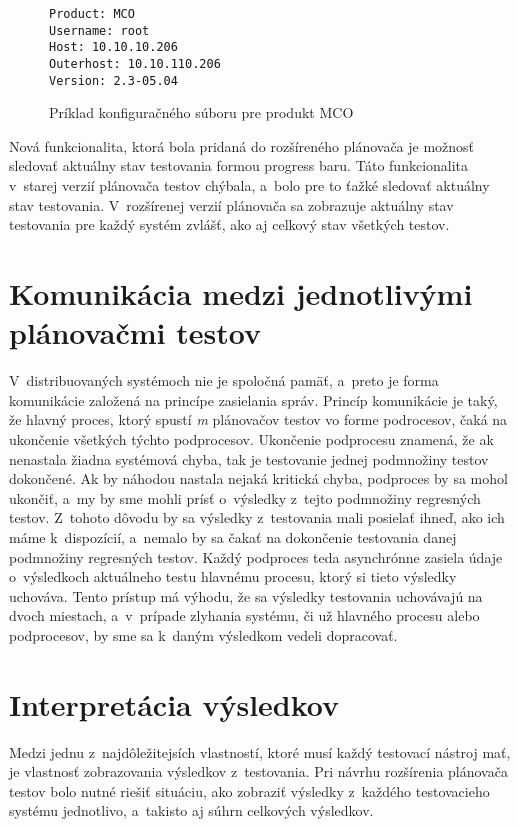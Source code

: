 \begin{figure}[h]
\begin{lstlisting}
Product: MCO
Username: root
Host: 10.10.10.206
Outerhost: 10.10.110.206
Version: 2.3-05.04
\end{lstlisting}
\caption{Príklad konfiguračného súboru pre produkt MCO}
\label{obrazok:priklad_konfig_suboru}
\end{figure}

Nová funkcionalita, ktorá bola pridaná do rozšíreného plánovača je možnosť sledovať aktuálny stav testovania
formou progress baru. Táto funkcionalita v~starej verzií plánovača testov chýbala, a~bolo pre to ťažké sledovať aktuálny
stav testovania. V~rozšírenej verzií plánovača sa zobrazuje aktuálny stav testovania pre každý systém zvlášť, ako aj
celkový stav všetkých testov.

\section{Komunikácia medzi jednotlivými plánovačmi testov}
\label{sekcia:komunikacia}
V~distribuovaných systémoch nie je spoločná pamäť, a~preto je forma komunikácie založená na princípe zasielania správ.
Princíp komunikácie je taký, že hlavný proces, ktorý spustí \emph{m} plánovačov testov vo forme podrocesov, čaká na ukončenie
všetkých týchto podprocesov. Ukončenie podprocesu znamená, že ak nenastala žiadna systémová chyba, tak je testovanie jednej
podmnožiny testov dokončené. Ak by náhodou nastala nejaká kritická chyba, podproces by sa mohol ukončiť, a~my by sme mohli prísť
o~výsledky z~tejto podmnožiny regresných testov. Z~tohoto dôvodu by sa výsledky z~testovania mali posielať ihneď, ako ich máme k~dispozícií,
a~nemalo by sa čakať na dokončenie testovania danej podmnožiny regresných testov. Každý podproces teda asynchrónne zasiela údaje o~výsledkoch
aktuálneho testu hlavnému procesu, ktorý si tieto výsledky uchováva. Tento prístup má výhodu, že sa výsledky testovania uchovávajú na dvoch miestach,
a~v~prípade zlyhania systému, či už hlavného procesu alebo podprocesov, by sme sa k~daným výsledkom vedeli dopracovať. 


\section{Interpretácia výsledkov}
\label{sekcia:interpretacia_vysledkov}
Medzi jednu z~najdôležitejsích vlastností, ktoré musí každý testovací nástroj mať, je vlastnosť zobrazovania výsledkov z~testovania.
Pri návrhu rozšírenia plánovača testov bolo nutné riešiť situáciu, ako zobraziť výsledky z~každého testovacieho systému jednotlivo,
a~takisto aj súhrn celkových výsledkov. 

